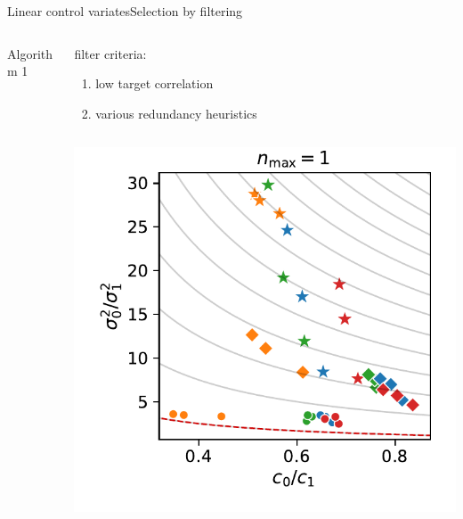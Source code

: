 \documentclass[9pt]{beamer}
\begin{document}
\begin{frame}{Linear control variates}{Selection by filtering}
\begin{columns}
\begin{column}{.4\textwidth}
\begin{block}{Algorithm 1}
\begin{figure}
\begin{tikzpicture}[node distance=1.8cm,
                every node/.style={fill=white, font=\sffamily}, align=center]
                \end{tikzpicture}
                \end{figure}
            \end{block}
        \end{column}
        \begin{column}{.55\textwidth}
            filter criteria:
            \begin{enumerate}
                \item low target correlation
                \item various redundancy heuristics
            \end{enumerate}
            \vspace{2em}
                    \begin{columns}
                        \begin{column}{.6\textwidth}
                            \includegraphics[width=\textwidth]{../gfx/eff_landscape_order1.pdf}\\

\end{column}
\end{columns}
\end{column}
\end{columns}
\end{frame}
\end{document}
